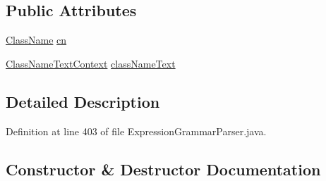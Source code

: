 \subsection*{Public Attributes}
\begin{DoxyCompactItemize}
\item 
\hyperlink{classgov_1_1nasa_1_1jpf_1_1inspector_1_1utils_1_1expressions_1_1_class_name}{Class\+Name} \hyperlink{classgov_1_1nasa_1_1jpf_1_1inspector_1_1server_1_1expression_1_1parser_1_1_expression_grammar_parser_1_1_class_name_context_adfd3eff7fa59de106f32ddb5f19117e8}{cn}
\item 
\hyperlink{classgov_1_1nasa_1_1jpf_1_1inspector_1_1server_1_1expression_1_1parser_1_1_expression_grammar_pa73f78f15ab35f00cdc76079d9a864524}{Class\+Name\+Text\+Context} \hyperlink{classgov_1_1nasa_1_1jpf_1_1inspector_1_1server_1_1expression_1_1parser_1_1_expression_grammar_parser_1_1_class_name_context_a8d13cb01acc743ec0cfccce9575c5833}{class\+Name\+Text}
\end{DoxyCompactItemize}


\subsection{Detailed Description}


Definition at line 403 of file Expression\+Grammar\+Parser.\+java.



\subsection{Constructor \& Destructor Documentation}

